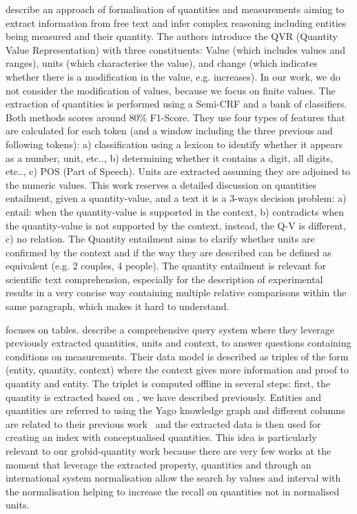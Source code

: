 \cite{roy2015reasoning} describe an approach of formalisation of quantities and measurements aiming to extract information from free text and infer complex reasoning including entities being measured and their quantity. 
The authors introduce the QVR (Quantity Value Representation) with three constituents: Value (which includes values and ranges), units (which characterise the value), and change (which indicates whether there is a modification in the value, e.g. increases). 
In our work, we do not consider the modification of values, because we focus on finite values. 
The extraction of quantities is performed using a Semi-CRF and a bank of classifiers. Both methods scores around 80\% F1-Score. 
They use four types of features that are calculated for each token (and a window including the three previous and following tokens): a) classification using a lexicon to identify whether it appears as a number, unit, etc.., b) determining whether it contains a digit, all digits, etc.., c) POS (Part of Speech). Units are extracted assuming they are adjoined to the numeric values. 
This work reserves a detailed discussion on quantities entailment, given a quantity-value, and a text it is a 3-ways decision problem: a) entail: when the quantity-value is supported in the context, b) contradicts when the quantity-value is not supported by the context, instead, the Q-V is different, c) no relation. 
The Quantity entailment aims to clarify whether units are confirmed by the context and if the way they are described can be defined as equivalent (e.g. 2 couples, 4 people). The quantity entailment is relevant for scientific text comprehension, especially for the description of experimental results in a very concise way containing multiple relative comparisons within the same paragraph, which makes it hard to understand. 

\cite{taha2021identifying, ho2021qute} focuses on tables.
\cite{ho2021qute} describe a comprehensive query system where they leverage previously extracted quantities, units and context, to answer questions containing conditions on measurements. 
Their data model is described as triples of the form (entity, quantity, context) where the context gives more information and proof to quantity and entity. 
The triplet is computed offline in several steps: first, the quantity is extracted based on \cite{roy2015reasoning}, we have described previously. 
Entities and quantities are referred to using the Yago knowledge graph and different columns are related to their previous work~\cite{ho2021extracting} and the extracted data is then used for creating an index with conceptualised quantities. 
This idea is particularly relevant to our grobid-quantity work because there are very few works at the moment that leverage the extracted property, quantities and through an international system normalisation allow the search by values and interval with the normalisation helping to increase the recall on quantities not in normalised units. 

